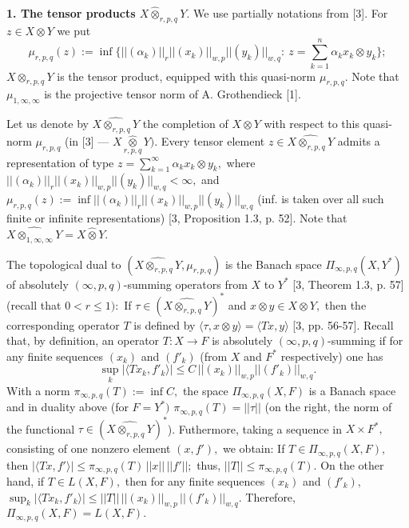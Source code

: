        {\bf 1. The tensor products $X\widehat\otimes_{r,p,q} Y.$}
       We use partially nota\-ti\-ons from [3].
   For $z\in X\otimes Y$ we put
  $$\mu_{r,p,q}(z):= \inf\{||(\alpha_k)||_r ||(x_k)||_{w,p} ||(y_k)||_{w,q}:\
  z=\sum_{k=1}^n \alpha_k x_k\otimes y_k\};$$
$X\otimes_{r,p,q} Y$ is the tensor product, equipped with this quasi-norm $\mu_{r,p,q}.$
Note that $\mu_{1,\infty,\infty}$ is the projective tensor norm of A. Grothendieck [1].

Let us denote by $\widehat{X\otimes_{r,p,q} Y}$ the completion of $X\otimes Y$ with respect to
this quasi-norm $\mu_{r,p,q}$ (in [3] --- $X\underset{r,p,q}{\widehat\otimes} Y).$
Every tensor element $z\in \widehat{X\otimes_{r,p,q} Y}$
admits a representation of type
$z= \sum_{k=1}^\infty \alpha_k x_k\otimes y_k,$
where $||(\alpha_k)||_r ||(x_k)||_{w,p} ||(y_k)||_{w,q}<\infty,$ and
$\mu_{r,p,q}(z):= \inf ||(\alpha_k)||_r ||(x_k)||_{w,p} ||(y_k)||_{w,q}$
(inf. is taken over all such finite or infinite representations) [3, Proposition 1.3, p. 52].
Note that $\widehat{X\otimes_{1,\infty,\infty} Y}= X\widehat\otimes Y.$

The topological dual to $(\widehat{X\otimes_{r,p,q} Y}, \mu_{r,p,q})$ is the Banach space
$\Pi_{\infty,p,q}(X,Y^*)$ of absolutely $(\infty,p,q)$-summing operators
from $X$ to $Y^*$ [3, Theorem 1.3, p. 57]
(recall that $0<r\leqslant1):$ If $\tau\in (\widehat{X\otimes_{r,p,q} Y})^*$ and
$x\otimes y\in X\otimes Y,$ then the corresponding operator $T$
is defined by $\langle \tau, x\otimes y\rangle= \langle Tx, y\rangle$ [3, pp. 56-57].
Recall that, by definition, an operator $T: X\to F$ is
absolutely $(\infty,p,q)$-summing if for any finite sequences
$(x_k)$ and $(f'_k)$ (from $X$ and $F^*$ respectively) one has
$$ \sup_k |\langle Tx_k, f'_k\rangle|\leqslant C\, ||(x_k)||_{w,p} ||(f'_k)||_{w,q}.
$$
With a norm $\pi_{\infty,p,q}(T):= \inf C,$ the space
 $\Pi_{\infty,p,q}(X, F)$ is a Banach space and in duality above (for $F=Y^*)$
 $\pi_{\infty,p,q}(T)= ||\tau||$ (on the right, the norm of the functional
  $\tau\in(\widehat{X\otimes_{r,p,q} Y})^*$).
 Futhermore, taking a sequence in $X\times F^*,$ consisting of one nonzero element
 $(x,f'),$ we obtain: If $T\in \Pi_{\infty,p,q}(X, F),$ then
 $|\langle Tx, f'\rangle|\leqslant \pi_{\infty,p,q}(T)\, ||x||\, ||f'||;$
 thus, $||T||\leqslant \pi_{\infty,p,q}(T).$
  On the other hand, if $T\in L(X,F),$ then
for any finite sequences $(x_k)$ and $(f'_k),$ \,
$\sup_k |\langle Tx_k, f'_k\rangle|\leqslant
 ||T||\, ||(x_k)||_{w,p}\, ||(f'_k)||_{w,q}.$
 There\-fo\-re,
 $\Pi_{\infty,p,q}(X, F)= L(X, F).$

